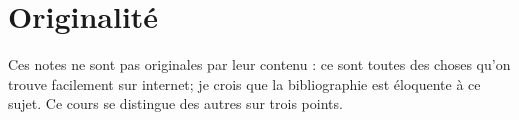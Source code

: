 
\section*{Originalité}

Ces notes ne sont pas originales par leur contenu : ce sont toutes des choses qu'on trouve facilement sur internet; je crois que la bibliographie est éloquente à ce sujet. Ce cours se distingue des autres sur trois points.
